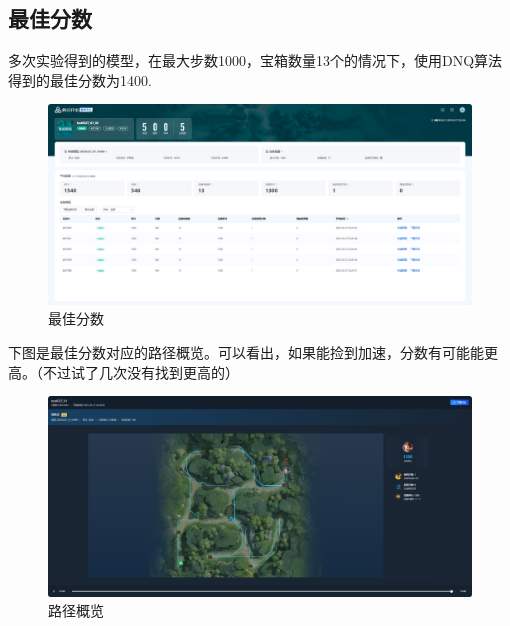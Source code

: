 \subsection{最佳分数}
多次实验得到的模型，在最大步数1000，宝箱数量13个的情况下，使用DNQ算法得到的最佳分数为1400.
\begin{figure}[H]
    \centering
    \includegraphics[width=0.8\linewidth]{pic/best-score.png}
    \caption{ 最佳分数}
    \label{best-score}
\end{figure}
下图是最佳分数对应的路径概览。可以看出，如果能捡到加速，分数有可能能更高。（不过试了几次没有找到更高的）
\begin{figure}[H]
    \centering
    \includegraphics[width=0.8\linewidth]{pic/best-map.png}
    \caption{ 路径概览}
    \label{path-overview}
\end{figure}